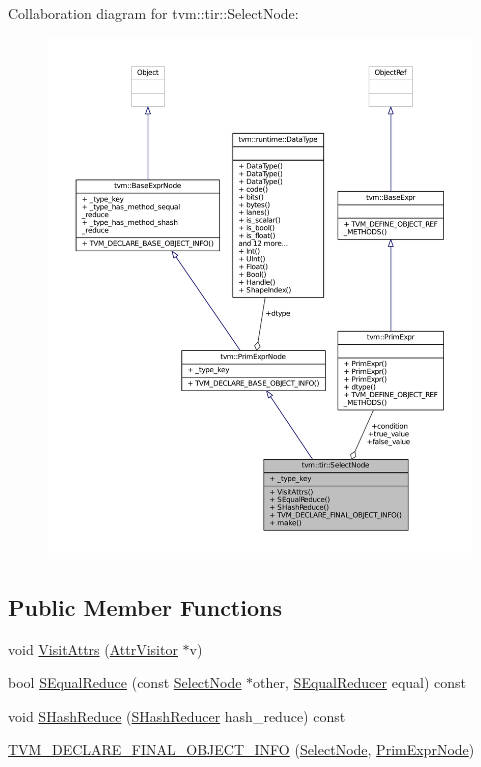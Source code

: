 Collaboration diagram for tvm\+:\+:tir\+:\+:Select\+Node\+:
\nopagebreak
\begin{figure}[H]
\begin{center}
\leavevmode
\includegraphics[width=350pt]{classtvm_1_1tir_1_1SelectNode__coll__graph}
\end{center}
\end{figure}
\subsection*{Public Member Functions}
\begin{DoxyCompactItemize}
\item 
void \hyperlink{classtvm_1_1tir_1_1SelectNode_aefaaf9f769543346665096278c20171f}{Visit\+Attrs} (\hyperlink{classtvm_1_1AttrVisitor}{Attr\+Visitor} $\ast$v)
\item 
bool \hyperlink{classtvm_1_1tir_1_1SelectNode_a59b1d0afce6d531401689e068bd1dc57}{S\+Equal\+Reduce} (const \hyperlink{classtvm_1_1tir_1_1SelectNode}{Select\+Node} $\ast$other, \hyperlink{classtvm_1_1SEqualReducer}{S\+Equal\+Reducer} equal) const 
\item 
void \hyperlink{classtvm_1_1tir_1_1SelectNode_a09494cfb4b80374aed26cc5d4d4c65a7}{S\+Hash\+Reduce} (\hyperlink{classtvm_1_1SHashReducer}{S\+Hash\+Reducer} hash\+\_\+reduce) const 
\item 
\hyperlink{classtvm_1_1tir_1_1SelectNode_a9d41cb89402fac92e634efe10daa1057}{T\+V\+M\+\_\+\+D\+E\+C\+L\+A\+R\+E\+\_\+\+F\+I\+N\+A\+L\+\_\+\+O\+B\+J\+E\+C\+T\+\_\+\+I\+N\+FO} (\hyperlink{classtvm_1_1tir_1_1SelectNode}{Select\+Node}, \hyperlink{classtvm_1_1PrimExprNode}{Prim\+Expr\+Node})
\end{DoxyCompactItemize}
